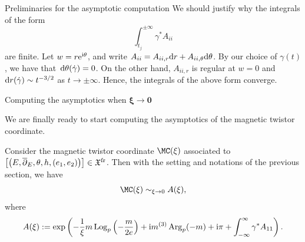 \begin{subsubsection}{Preliminaries for the asymptotic computation}
We should justify why the integrals of the form
\begin{equation}\label{finitenessint}
 \int_{t_j}^{\pm \infty} \gamma^*A_{ii}
\end{equation}
are finite. Let $w=r{\rm e}^{{\rm i}\theta}$, and write $A_{ii}=A_{ii,r}{\rm d}r+A_{ii,\theta}{\rm d}\theta$. By our choice of $\gamma(t)$, we have that~${{\rm d}\theta(\dot{\gamma})=0}$. On the other hand, $A_{ii,r}$ is regular at $w=0$ and ${\rm d}r(\dot{\gamma})\sim t^{-3/2}$ as $t \to \pm \infty$. Hence, the integrals of the above form converge.
\end{subsubsection}

\begin{subsubsection}{Computing the asymptotics when $\boldsymbol{\xi \to 0}$}\label{asymp0}

We are finally ready to start computing the asymptotics of the magnetic twistor coordinate.

\begin{Theorem} \label{a0} Consider the magnetic twistor coordinate $\MC(\xi)$ associated to $\bigl[\bigl(E,\overline{\partial}_E,\theta,h,\allowbreak(e_1,e_2)\bigr)\bigr]\in \mathfrak{X}^{{\rm fr}}$. Then with the setting and notations of the previous section, we have
\begin{equation*}
 \MC(\xi)\sim_{\xi \to 0} A(\xi),
\end{equation*}
where
\begin{equation*}
A(\xi):=\exp \left(-\frac{1}{\xi}m\operatorname{Log}_p\left(-\frac{m}{2e}\right)+{\rm i}m^{(3)}\operatorname{Arg}_p(-m)+{\rm i}\pi
+\int_{-\infty}^{\infty}\gamma^*A_{11}\right).
\end{equation*}

\end{Theorem}


\end{subsubsection}
